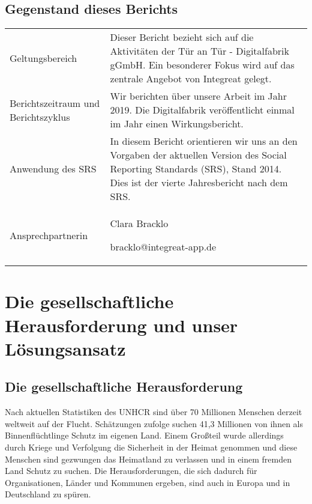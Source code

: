 \documentclass[12pt, a4paper]{article} %
\begin{document}
\hypertarget{gegenstand-dieses-berichts}{%
\subsection{Gegenstand dieses Berichts}\label{gegenstand-dieses-berichts}}

\begin{longtable}[]{@{}ll@{}}
\toprule
\endhead
Geltungsbereich & Dieser Bericht bezieht sich auf die Aktivitäten der
Tür an Tür - Digitalfabrik gGmbH. Ein besonderer Fokus wird auf das
zentrale Angebot von Integreat gelegt.\tabularnewline
Berichtszeitraum und Berichtszyklus & Wir berichten über unsere Arbeit
im Jahr 2019. Die Digitalfabrik veröffentlicht einmal im Jahr einen
Wirkungsbericht.\tabularnewline
Anwendung des SRS & In diesem Bericht orientieren wir uns an den
Vorgaben der aktuellen Version des Social Reporting Standards (SRS),
Stand 2014. Dies ist der vierte Jahresbericht nach dem
SRS.\tabularnewline
\begin{minipage}[t]{0.47\columnwidth}\raggedright
Ansprechpartnerin\strut
\end{minipage} & \begin{minipage}[t]{0.47\columnwidth}\raggedright
Clara Bracklo

bracklo@integreat-app.de\strut
\end{minipage}\tabularnewline
\bottomrule
\end{longtable}

\hypertarget{die-gesellschaftliche-herausforderung-und-unser-luxf6sungsansatz}{%
\section{Die gesellschaftliche Herausforderung und unser
Lösungsansatz}\label{die-gesellschaftliche-herausforderung-und-unser-luxf6sungsansatz}}

\hypertarget{die-gesellschaftliche-herausforderung}{%
\subsection{Die gesellschaftliche
Herausforderung}\label{die-gesellschaftliche-herausforderung}}

Nach aktuellen Statistiken des UNHCR sind über 70 Millionen Menschen
derzeit weltweit auf der Flucht. Schätzungen zufolge suchen 41,3
Millionen von ihnen als Binnenflüchtlinge Schutz im eigenen Land. Einem
Großteil wurde allerdings durch Kriege und Verfolgung die Sicherheit in
der Heimat genommen und diese Menschen sind gezwungen das Heimatland zu
verlassen und in einem fremden Land Schutz zu suchen. Die
Herausforderungen, die sich dadurch für Organisationen, Länder und
Kommunen ergeben, sind auch in Europa und in Deutschland zu spüren.
\end{document}
